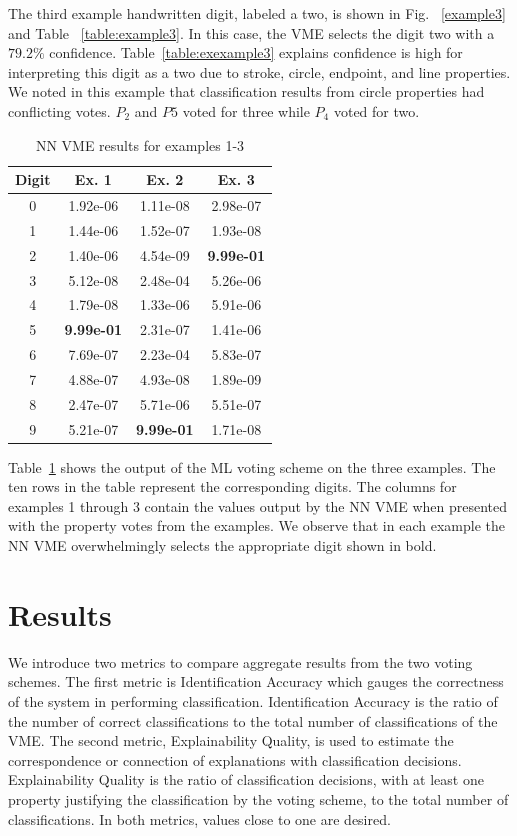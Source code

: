 \documentclass[conference]{IEEEtran}
\begin{document}
The third example handwritten digit, labeled a two, is shown in Fig. ~\ref{example3} and Table ~\ref{table:example3}.  In this case,  the VME selects the digit two with a $79.2\%$ confidence.  Table~\ref{table:exexample3} explains confidence is high for interpreting this digit as a two due to stroke, circle, endpoint, and line properties.  We noted in this example that classification results from circle properties had conflicting votes.  $P_2$ and $P5$ voted for three while $P_4$ voted for two.

\begin{table}[htbp]
\caption{NN VME results for examples 1-3}
\centering
\begin{tabular}{| c | c | c | c |}
\hline
 Digit & Ex. 1 & Ex. 2 & Ex. 3 \\
\hline\hline
0 & 1.92e-06 & 1.11e-08 & 2.98e-07\\ 
\hline
1 & 1.44e-06 & 1.52e-07 & 1.93e-08 \\
\hline
2 & 1.40e-06 & 4.54e-09 & \textbf{9.99e-01} \\
\hline
3 & 5.12e-08 & 2.48e-04 & 5.26e-06 \\
\hline
4 & 1.79e-08 & 1.33e-06 & 5.91e-06 \\
\hline
5 & \textbf{9.99e-01} & 2.31e-07 & 1.41e-06 \\
\hline
6 & 7.69e-07 & 2.23e-04 & 5.83e-07 \\
\hline
7 & 4.88e-07 & 4.93e-08 & 1.89e-09 \\
\hline
8 & 2.47e-07 & 5.71e-06 & 5.51e-07 \\
\hline
9 & 5.21e-07 & \textbf{9.99e-01} & 1.71e-08 \\
\hline
\end{tabular}
\label{table:nnavoter}
\end{table}

Table~\ref{table:nnavoter} shows the output of the ML voting scheme on the three examples.  The ten rows in the table represent the corresponding digits.  The columns for examples 1 through 3 contain the values output by the NN VME when presented with the property votes from the examples.  We observe that in each example the NN VME overwhelmingly selects the appropriate digit shown in bold.

\section{Results}

We introduce two metrics to compare aggregate results from the two voting schemes.  The first metric is Identification Accuracy which gauges the correctness of the system in performing classification.  Identification Accuracy is the ratio of the number of correct classifications to the total number of classifications of the VME.  The second metric, Explainability Quality, is used to estimate the correspondence or connection of explanations with classification decisions.  Explainability Quality is the ratio of classification decisions, with at least one property justifying the classification by the voting scheme, to the total number of classifications.   In both metrics, values close to one are desired.
\end{document}
